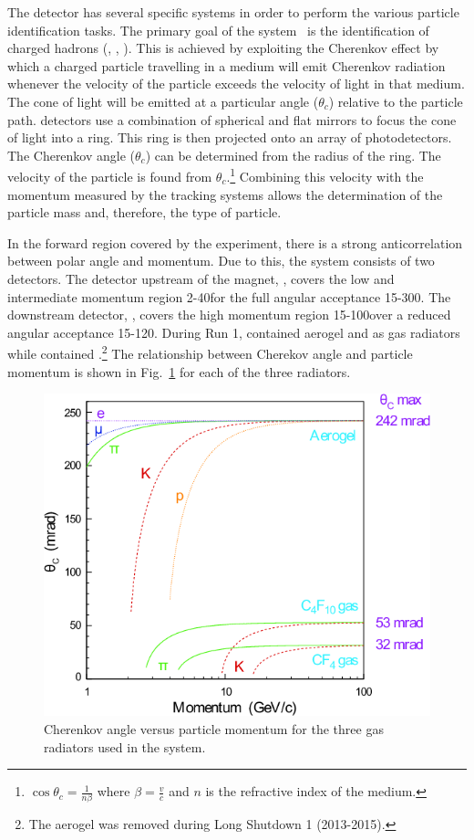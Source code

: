The \lhcb detector has several specific systems in order to perform the various particle identification tasks. The primary goal of the \rich system~\cite{LHCb-TDR-009,LHCb-DP-2012-003} is the identification of charged hadrons (\pion, \kaon, \proton). This is achieved by exploiting the Cherenkov effect by which a charged particle travelling in a medium will emit Cherenkov radiation whenever the velocity of the particle exceeds the velocity of light in that medium. The cone of light will be emitted at a particular angle ($\theta_{c}$) relative to the particle path. \rich detectors use a combination of spherical and flat mirrors to focus the cone of light into a ring. This ring is then projected onto an array of photodetectors. The Cherenkov angle ($\theta_{c}$) can be determined from the radius of the ring. The velocity of the particle is found from $\theta_{c}$.\footnote{$\cos\theta_{c} = \frac{1}{n\beta}$ where $\beta = \frac{v}{c}$ and $n$ is the refractive index of the medium.} Combining this velocity with the momentum measured by the tracking systems allows the determination of the particle mass and, therefore, the type of particle. 

In the forward region covered by the \lhcb experiment, there is a strong anticorrelation between polar angle and momentum. Due to this, the \rich system consists of two detectors. The detector upstream of the magnet, \richone, covers the low and intermediate momentum region 2-40\gevc for the full angular acceptance 15-300\mrad. The downstream detector, \richtwo, covers the high momentum region 15-100\gevc over a reduced angular acceptance 15-120\mrad. During Run 1, \richone contained aerogel and \cfourften as gas radiators while \richtwo contained \cffour.\footnote{The aerogel was removed during Long Shutdown 1 (2013-2015).} The relationship between Cherekov angle and particle momentum is shown in Fig.~\ref{fig:radiators} for each of the three radiators.

\begin{figure}[!tb]
\centering
\includegraphics[height=0.3\textheight]{figs/detector/radiators.png}
\caption{Cherenkov angle versus particle momentum for the three gas radiators used in the \rich system.}
\label{fig:radiators}
\end{figure}

